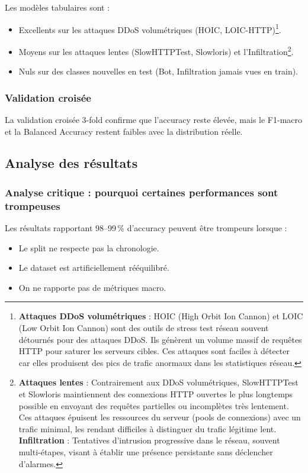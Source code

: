 ﻿\documentclass[11pt,a4paper]{article}
\begin{document}
Les modèles tabulaires sont :
\begin{itemize}
    \item Excellents sur les attaques DDoS volumétriques (HOIC, LOIC-HTTP)\footnote{\textbf{Attaques DDoS volumétriques} : HOIC (High Orbit Ion Cannon) et LOIC (Low Orbit Ion Cannon) sont des outils de stress test réseau souvent détournés pour des attaques DDoS. Ils génèrent un volume massif de requêtes HTTP pour saturer les serveurs cibles. Ces attaques sont faciles à détecter car elles produisent des pics de trafic anormaux dans les statistiques réseau.}.
    \item Moyens sur les attaques lentes (SlowHTTPTest, Slowloris) et l'Infiltration\footnote{\textbf{Attaques lentes} : Contrairement aux DDoS volumétriques, SlowHTTPTest et Slowloris maintiennent des connexions HTTP ouvertes le plus longtemps possible en envoyant des requêtes partielles ou incomplètes très lentement. Ces attaques épuisent les ressources du serveur (pools de connexions) avec un trafic minimal, les rendant difficiles à distinguer du trafic légitime lent. \textbf{Infiltration} : Tentatives d'intrusion progressive dans le réseau, souvent multi-étapes, visant à établir une présence persistante sans déclencher d'alarmes.}.
    \item Nuls sur des classes nouvelles en test (Bot, Infiltration jamais vues en train).
\end{itemize}

\subsubsection{Validation croisée}

La validation croisée 3-fold confirme que l'accuracy reste élevée, mais le F1-macro et la Balanced Accuracy restent faibles avec la distribution réelle.

\subsection{Analyse des résultats}

\subsubsection{Analyse critique : pourquoi certaines performances sont trompeuses}

Les résultats rapportant 98--99\,\% d'accuracy peuvent être trompeurs lorsque :
\begin{itemize}
    \item Le split ne respecte pas la chronologie.
    \item Le dataset est artificiellement rééquilibré.
    \item On ne rapporte pas de métriques macro.
\end{itemize}
\end{document}
